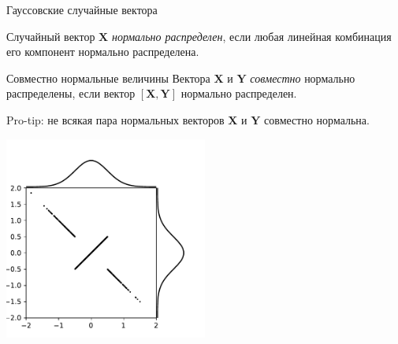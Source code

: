 \documentclass[fullscreen=true, bookmarks=true, hyperref={pdfencoding=unicode}]{beamer}
\begin{document}
\begin{frame}{Гауссовские случайные вектора}

    Случайный вектор $\mathbf{X}$ \textit{нормально распределен}, если любая линейная комбинация его компонент нормально распределена.



\end{frame}

\begin{frame}{Совместно нормальные величины}
    Вектора $ \mathbf{X} $ и $ \mathbf{Y} $ \textit{совместно} нормально распределены, если вектор $ [\mathbf{X}, \mathbf{Y}] $ нормально распределен.

    \pause
    Pro-tip: не всякая пара нормальных векторов $ \mathbf{X} $ и $ \mathbf{Y} $ совместно нормальна.

    \centerline{\includegraphics[width=0.5\textwidth]{non-jointly-gaussian.pdf}}
\end{frame}
\end{document}
